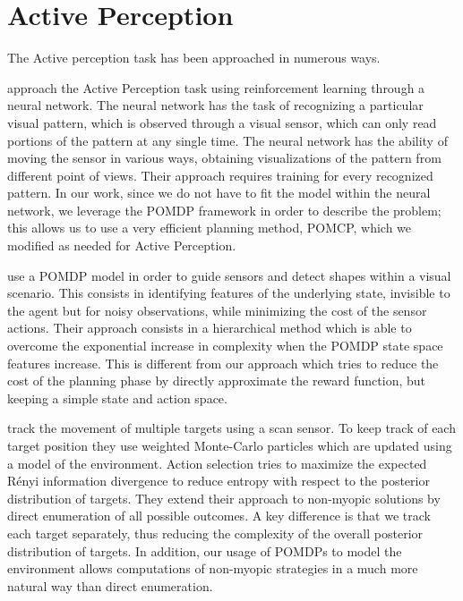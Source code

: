 \section{Active Perception}

The Active perception task has been approached in numerous ways.

\citet{cit:relworkneuralnet} approach the Active Perception task using reinforcement learning through
a neural network. The neural network has the task of recognizing a particular visual pattern, which
is observed through a visual sensor, which can only read portions of the pattern at any single time.
The neural network has the ability of moving the sensor in various ways, obtaining visualizations of
the pattern from different point of views. Their approach requires training for every recognized
pattern. In our work, since we do not have to fit the model within the neural network, we leverage
the POMDP framework in order to describe the problem; this allows us to use a very efficient
planning method, POMCP, which we modified as needed for Active Perception.

\citet{cit:relworkplanningsee} use a POMDP model in order to guide sensors and detect shapes within
a visual scenario. This consists in identifying features of the underlying state, invisible to the agent but
for noisy observations, while minimizing the cost of the sensor actions. Their approach consists in a
hierarchical method which is able to overcome the exponential increase in complexity when the POMDP 
state space features increase. This is different from our approach which tries to reduce the cost of the
planning phase by directly approximate the reward function, but keeping a simple state and action space.

\citet{cit:relworktanks} track the movement of multiple targets using a scan sensor. To keep track
of each target position they use weighted Monte-Carlo particles which are updated using a model of
the environment. Action selection tries to maximize the expected Rényi information divergence to
reduce entropy with respect to the posterior distribution of targets. They extend their approach to
non-myopic solutions by direct enumeration of all possible outcomes. A key difference is that we
track each target separately, thus reducing the complexity of the overall posterior distribution of
targets. In addition, our usage of POMDPs to model the environment allows computations of non-myopic
strategies in a much more natural way than direct enumeration.

